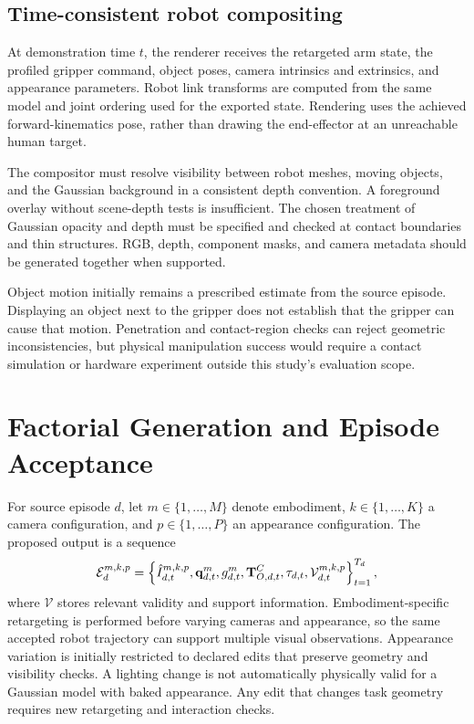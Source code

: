 \subsection{Time-consistent robot compositing}

At demonstration time $t$, the renderer receives the retargeted arm state,
the profiled gripper command, object poses, camera intrinsics and
extrinsics, and appearance parameters. Robot link transforms are computed
from the same model and joint ordering used for the exported state.
Rendering uses the achieved forward-kinematics pose, rather than drawing
the end-effector at an unreachable human target.

The compositor must resolve visibility between robot meshes, moving
objects, and the Gaussian background in a consistent depth convention.
A foreground overlay without scene-depth tests is insufficient. The
chosen treatment of Gaussian opacity and depth must be specified and
checked at contact boundaries and thin structures. RGB, depth, component
masks, and camera metadata should be generated together when supported.

Object motion initially remains a prescribed estimate from the source
episode. Displaying an object next to the gripper does not establish that
the gripper can cause that motion. Penetration and contact-region checks
can reject geometric inconsistencies, but physical manipulation success
would require a contact simulation or hardware experiment outside this
study's evaluation scope.

\section{Factorial Generation and Episode Acceptance}
\label{sec:factorial-method}

For source episode $d$, let $m\in\{1,\ldots,M\}$ denote embodiment,
$k\in\{1,\ldots,K\}$ a camera configuration, and
$p\in\{1,\ldots,P\}$ an appearance configuration. The proposed output is
a sequence
\begin{equation}
  \mathcal E_d^{m,k,p}=
  \left\{\hat I_{d,t}^{m,k,p},\mathbf{q}_{d,t}^{m},g_{d,t}^{m},
         \mathbf{T}^C_{O,d,t},\tau_{d,t},\mathcal V_{d,t}^{m,k,p}\right\}_{t=1}^{T_d},
  \label{eq:factorial-episode}
\end{equation}
where $\mathcal V$ stores relevant validity and support information.
Embodiment-specific retargeting is performed before varying cameras and
appearance, so the same accepted robot trajectory can support multiple
visual observations. Appearance variation is initially restricted to
declared edits that preserve geometry and visibility checks. A lighting
change is not automatically physically valid for a Gaussian model with
baked appearance. Any edit that changes task geometry requires new
retargeting and interaction checks.

